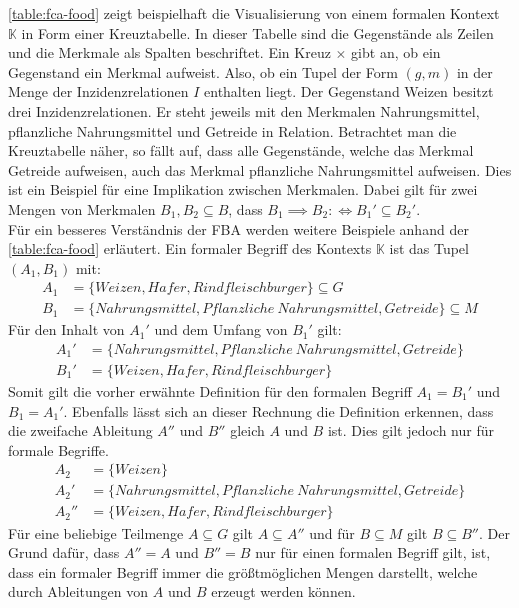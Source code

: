 \autoref{table:fca-food} zeigt beispielhaft die Visualisierung von einem formalen Kontext $\mathbb{K}$ in Form einer Kreuztabelle.
In dieser Tabelle sind die Gegenstände als Zeilen und die Merkmale als Spalten beschriftet.
Ein Kreuz $\times$ gibt an, ob ein Gegenstand ein Merkmal aufweist.
Also, ob ein Tupel der Form $(g,m)$ in der Menge der Inzidenzrelationen $I$ enthalten liegt.
Der Gegenstand Weizen besitzt drei Inzidenzrelationen.
Er steht jeweils mit den Merkmalen Nahrungsmittel, pflanzliche Nahrungsmittel und Getreide in Relation.
Betrachtet man die Kreuztabelle näher, so fällt auf, dass alle Gegenstände, welche das Merkmal Getreide aufweisen, auch das Merkmal pflanzliche Nahrungsmittel aufweisen.
Dies ist ein Beispiel für eine Implikation zwischen Merkmalen.
Dabei gilt für zwei Mengen von Merkmalen $B_1, B_2 \subseteq B$, dass $B_1\implies B_2 :\iff B_1' \subseteq B_2'$.\\

Für ein besseres Verständnis der \ac{FBA} werden weitere Beispiele anhand der \autoref{table:fca-food} erläutert.
Ein formaler Begriff des Kontexts $\mathbb{K}$ ist das Tupel $(A_1, B_1)$ mit:
\begin{align}
    A_1 & = \{Weizen, Hafer, Rindfleischburger\} \subseteq G                     \\
    B_1 & = \{Nahrungsmittel, Pflanzliche\ Nahrungsmittel,Getreide\} \subseteq M
\end{align}
Für den Inhalt von $A_1'$ und dem Umfang von $B_1'$ gilt:
\begin{align}
    A_1' & = \{Nahrungsmittel, Pflanzliche\ Nahrungsmittel, Getreide\} \\
    B_1' & = \{Weizen, Hafer, Rindfleischburger\}
\end{align}
Somit gilt die vorher erwähnte Definition für den formalen Begriff $A_1 = B_1'$ und $B_1 = A_1'$.
Ebenfalls lässt sich an dieser Rechnung die Definition erkennen, dass die zweifache Ableitung $A''$ und $B''$ gleich $A$ und $B$ ist.
Dies gilt jedoch nur für formale Begriffe.
\setcounter{equation}{0}
\begin{align}
    A_2   & = \{Weizen\}                                                \\
    A_2'  & = \{Nahrungsmittel, Pflanzliche\ Nahrungsmittel, Getreide\} \\
    A_2'' & = \{Weizen, Hafer, Rindfleischburger\}
\end{align}
Für eine beliebige Teilmenge $A \subseteq G$ gilt $A \subseteq A''$ und für $B \subseteq M$ gilt $B \subseteq B''$.
Der Grund dafür, dass $A'' = A$ und $B'' = B$ nur für einen formalen Begriff gilt, ist, dass ein formaler Begriff immer die größtmöglichen Mengen darstellt, welche durch Ableitungen von $A$ und $B$ erzeugt werden können.\\

